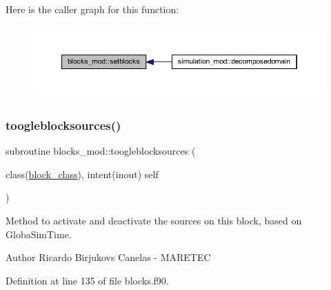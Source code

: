 Here is the caller graph for this function\+:\nopagebreak
\begin{figure}[H]
\begin{center}
\leavevmode
\includegraphics[width=350pt]{namespaceblocks__mod_a8f5a5d9e6cfd16cfd1b179092a204696_icgraph}
\end{center}
\end{figure}
\mbox{\label{namespaceblocks__mod_ab9e57cbf0103b632b2b2dfa4e4d4139c}} 
\subsubsection{\texorpdfstring{toogleblocksources()}{toogleblocksources()}}
{\footnotesize\ttfamily subroutine blocks\+\_\+mod\+::toogleblocksources (\begin{DoxyParamCaption}\item[{class(\mbox{\hyperlink{structblocks__mod_1_1block__class}{block\+\_\+class}}), intent(inout)}]{self }\end{DoxyParamCaption})\hspace{0.3cm}{\ttfamily [private]}}



Method to activate and deactivate the sources on this block, based on GlobaSim\+Time. 

\begin{DoxyAuthor}{Author}
Ricardo Birjukovs Canelas -\/ M\+A\+R\+E\+T\+EC 
\end{DoxyAuthor}


Definition at line 135 of file blocks.\+f90.


